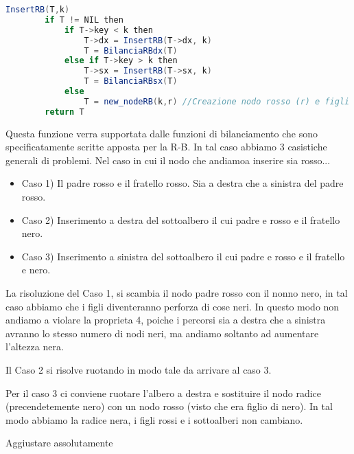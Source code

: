 \begin{lstlisting}[language=Java]
	InsertRB(T,k)
		if T != NIL then
			if T->key < k then
				T->dx = InsertRB(T->dx, k)
				T = BilanciaRBdx(T)
			else if T->key > k then
				T->sx = InsertRB(T->sx, k)
				T = BilanciaRBsx(T)
			else
				T = new_nodeRB(k,r) //Creazione nodo rosso (r) e figli a NIL
		return T
\end{lstlisting}

Questa funzione verra supportata dalle funzioni di bilanciamento che sono specificatamente scritte apposta per la R-B. In tal caso abbiamo 3 casistiche generali di problemi.
Nel caso in cui il nodo che andiamoa  inserire sia rosso...

\begin{itemize}
	\item Caso 1) Il padre rosso e il fratello rosso. Sia a destra che a sinistra del padre rosso.
	\item Caso 2) Inserimento a destra del sottoalbero il cui padre e rosso e il fratello nero.
	\item Caso 3) Inserimento a sinistra del sottoalbero il cui padre e rosso e il fratello e nero.
\end{itemize}

La risoluzione del Caso 1, si scambia il nodo padre rosso con il nonno nero, in tal caso abbiamo che i figli diventeranno perforza di cose neri. In questo modo non andiamo a violare la proprieta 4, poiche i percorsi sia a destra che a sinistra avranno lo stesso numero di nodi neri, ma andiamo soltanto ad aumentare l'altezza nera.

Il Caso 2 si risolve ruotando in modo tale da arrivare al caso 3.

Per il caso 3 ci conviene ruotare l'albero a destra e sostituire il nodo radice (precendetemente nero) con un nodo rosso (visto che era figlio di nero). In tal modo abbiamo la radice nera, i figli rossi e i sottoalberi non cambiano.

Aggiustare assolutamente